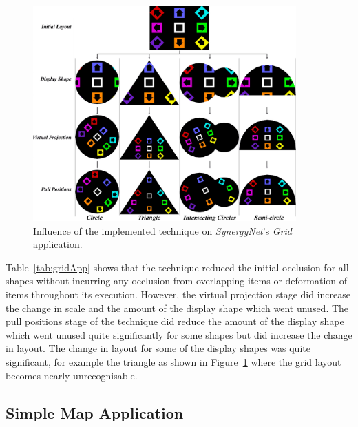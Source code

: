 \documentclass[twocolumn,compsoc]{cvm}
\begin{document}
{\begin{figure}[p]
 \centering
  \includegraphics[width=0.9\textwidth]{figures/GridApplication.jpeg}
  \caption{Influence of the implemented technique on {\emph{SynergyNet}}'s {\emph{Grid}} application.}
  \label{fig:gridApp}
\end{figure}

Table~\ref{tab:gridApp} shows that the technique reduced the initial occlusion for all shapes without incurring any occlusion from overlapping items or deformation of items throughout its execution.
However, the virtual projection stage did increase the change in scale and the amount of the display shape which went unused.
The pull positions stage of the technique did reduce the amount of the display shape which went unused quite significantly for some shapes but did increase the change in layout.
The change in layout for some of the display shapes was quite significant, for example the triangle as shown in Figure~\ref{fig:gridApp} where the grid layout becomes nearly unrecognisable.


\subsection{Simple Map Application}
\label{subsec:simplemapresults} 

}
\end{document}
